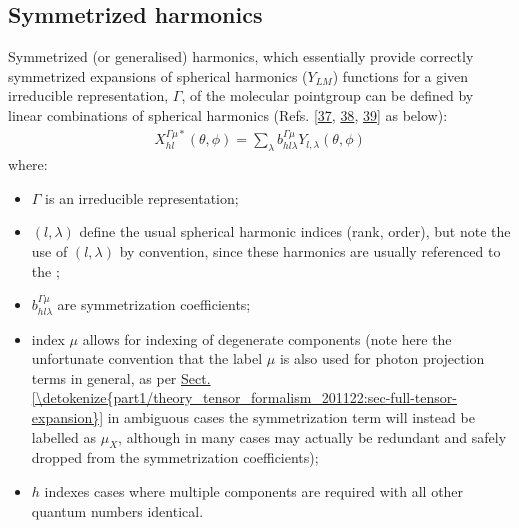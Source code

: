 \documentclass[letterpaper,table,10pt,english]{jupyterBook}
\begin{document}
\subsection{Symmetrized harmonics}
\label{\detokenize{part1/theory_observables_intro_211122:symmetrized-harmonics}}\label{\detokenize{part1/theory_observables_intro_211122:sec-theory-sym-harm-into}}
\sphinxAtStartPar
Symmetrized (or generalised) harmonics, which essentially provide correctly symmetrized expansions of spherical harmonics (\(Y_{LM}\)) functions for a given irreducible representation, \(\Gamma\), of the molecular point\sphinxhyphen{}group can be defined by linear combinations of spherical harmonics (Refs. {[}\hyperlink{cite.backmatter/bibliography:id454}{37}, \hyperlink{cite.backmatter/bibliography:id455}{38}, \hyperlink{cite.backmatter/bibliography:id496}{39}{]} as below):
\begin{equation}\label{equation:part1/theory_observables_intro_211122:eq:symHarm-defn}
\begin{split}
X_{hl}^{\Gamma\mu*}(\theta,\phi)=\sum_{\lambda}b_{hl\lambda}^{\Gamma\mu}Y_{l,\lambda}(\theta,\phi)
\end{split}
\end{equation}
\sphinxAtStartPar
where:
\begin{itemize}
\item {} 
\sphinxAtStartPar
\(\Gamma\) is an irreducible representation;

\item {} 
\sphinxAtStartPar
\((l, \lambda)\) define the usual spherical harmonic indices (rank, order), but note the use of \((l, \lambda)\) by convention, since these harmonics are usually referenced to the {\hyperref[\detokenize{backmatter/glossary:term-MF}]{}};

\item {} 
\sphinxAtStartPar
\(b_{hl\lambda}^{\Gamma\mu}\) are symmetrization coefficients;

\item {} 
\sphinxAtStartPar
index \(\mu\) allows for indexing of degenerate components (note here the unfortunate convention that the label \(\mu\) is also used for photon projection terms in general, as per \hyperref[\detokenize{part1/theory_tensor_formalism_201122:sec-full-tensor-expansion}]{Sect.\@ \ref{\detokenize{part1/theory_tensor_formalism_201122:sec-full-tensor-expansion}}} \sphinxhyphen{} in ambiguous cases the symmetrization term will instead be labelled as \(\mu_X\), although in many cases may actually be redundant and safely dropped from the symmetrization coefficients);

\item {} 
\sphinxAtStartPar
\(h\) indexes cases where multiple components are required with all other quantum numbers identical.

\end{itemize}
\end{document}
